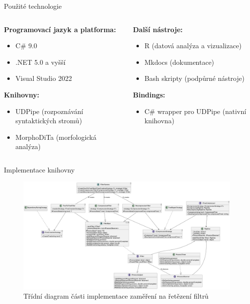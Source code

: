 \documentclass[lualatex,hyperref={pdfencoding=auto}]{beamer}
\begin{document}
\begin{frame}{Použité technologie}
    \begin{columns}[t] %
        \begin{column}{0.5\textwidth}
            \vspace{0pt} %
            \textbf{Programovací jazyk a platforma:}
            \begin{itemize}
                \item C\# 9.0
                \item .NET 5.0 a vyšší
                \item Visual Studio 2022
            \end{itemize}

                
            \textbf{Knihovny:}
            \begin{itemize}
                \item UDPipe 
                (rozpoznávání syntaktických stromů)
                \item MorphoDiTa (morfologická analýza)
            \end{itemize}
        \end{column}
        
        \begin{column}{0.5\textwidth}
            \vspace{0pt} %
            \textbf{Další nástroje:}
            \begin{itemize}
                \item R (datová analýza a vizualizace)
                \item Mkdocs (dokumentace)
                \item Bash skripty (podpůrné nástroje)
            \end{itemize}
            
            \textbf{Bindings:}
            \begin{itemize}
                \item C\# wrapper pro UDPipe (nativní knihovna)
            \end{itemize}
        \end{column}
    \end{columns}
\end{frame}


\begin{frame}{Implementace knihovny}
    \begin{figure}
        \centering
        \includegraphics[width=\textwidth]{fig/class-diagram.png}
        \caption{Třídní diagram části implementace zaměření na řetězení filtrů}
        \label{fig:class-diagram}
    \end{figure}
    
\end{frame}
\end{document}
